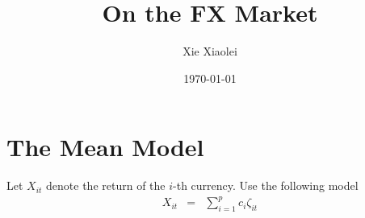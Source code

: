 \documentclass{article}
\title{On the FX Market}
\author{Xie Xiaolei}
\date{\today}
\begin{document}
\maketitle

\section{The Mean Model}\label{sec:mean_model}
Let $X_{it}$ denote the return of the $i$-th currency. Use the
following model
\begin{eqnarray*}
  X_{it} &=& \sum_{i=1}^p c_i \zeta_{it}
\end{eqnarray*}


\end{document}
